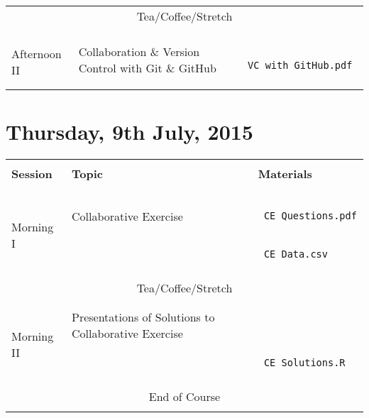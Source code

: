 \documentclass{article}[12pt]
\begin{document}
\begin{table}[h!]
\begin{tabular}{ |p{2cm}|p{5cm}|p{6cm}| }
\multicolumn{3}{c}{Tea/Coffee/Stretch}  \\ 
\multicolumn{3}{c}{} \\ \hline
                               &                              & \\
\multirow{3}{*}{Afternoon II}  & Collaboration \& Version Control with Git \& GitHub & \begin{verbatim} VC_with_GitHub.pdf \end{verbatim} \\
                               &                              & \\ \hline \hline
\end{tabular}
\end{table}

\clearpage
\section*{Thursday, 9th July, 2015}
\begin{table}[h!]
\begin{tabular}{ |p{2cm}|p{5cm}|p{6cm}| }
\hline
                               &                              & \\
\textbf{Session}               & \textbf{Topic}               & \textbf{Materials} \\ 
                               &                              & \\ \hline \hline
 & & \\



 & & \\
\multirow{2}{*}{Morning I }    & Collaborative Exercise & \begin{verbatim} CE_Questions.pdf \end{verbatim}  \\
                              & &  \begin{verbatim} CE_Data.csv \end{verbatim} \\ \hline 
\multicolumn{3}{c}{} \\ 
\multicolumn{3}{c}{Tea/Coffee/Stretch}  \\ 
\multicolumn{3}{c}{} \\ \hline
 & & \\
\multirow{2}{*}{Morning II}      & Presentations of Solutions to Collaborative Exercise      & \\
 & & \begin{verbatim} CE_Solutions.R \end{verbatim} \\ \hline
\multicolumn{3}{c}{} \\
\multicolumn{3}{c}{End of Course}  \\ 
\multicolumn{3}{c}{} \\
\end{tabular}
\end{table}
\end{document}
